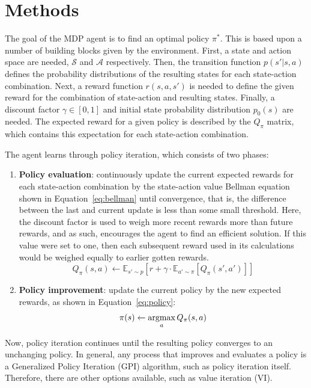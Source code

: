 \documentclass[sigconf,nonacm]{acmart}
\newcommand{\argmax}{\mathop{\mathrm{argmax}}}
\begin{document}
\section{Methods}
The goal of the MDP agent is to find an optimal policy $\pi^*$. This is based upon a number of building blocks given by the environment. First, a state and action space are needed, $\mathcal{S}$ and $\mathcal{A}$ respectively. Then, the transition function $p(s'|s,a)$ defines the probability distributions of the resulting states for each state-action combination. Next, a reward function $r(s,a,s')$ is needed to define the given reward for the combination of state-action and resulting states. Finally, a discount factor $\gamma\in[0,1]$ and initial state probability distribution $p_0(s)$ are needed. The expected reward for a given policy is described by the $Q_\pi$ matrix, which contains this expectation for each state-action combination.

The agent learns through policy iteration, which consists of two phases:
\begin{enumerate}
    \item \textbf{Policy evaluation}: continuously update the current expected rewards for each state-action combination by the state-action value Bellman equation shown in Equation~\ref{eq:bellman} until convergence, that is, the difference between the last and current update is less than some small threshold. Here, the discount factor is used to weigh more recent rewards more than future rewards, and as such, encourages the agent to find an efficient solution. If this value were set to one, then each subsequent reward used in its calculations would be weighed equally to earlier gotten rewards.
    \begin{equation}
        Q_\pi(s,a)\leftarrow\mathbb{E}_{s'\sim p}\left[r+\gamma\cdot\mathbb{E}_{a'\sim\pi}\left[Q_\pi(s',a')\right]\right]
        \label{eq:bellman}
    \end{equation}
    \item \textbf{Policy improvement}: update the current policy by the new expected rewards, as shown in Equation~\ref{eq:policy}:
    \begin{equation}
        \pi(s)\leftarrow \argmax_{a}\space Q_\pi(s,a)
        \label{eq:policy}
    \end{equation}
\end{enumerate}
Now, policy iteration continues until the resulting policy converges to an unchanging policy. In general, any process that improves and evaluates a policy is a Generalized Policy Iteration (GPI) algorithm, such as policy iteration itself. Therefore, there are other options available, such as value iteration (VI).
\end{document}
